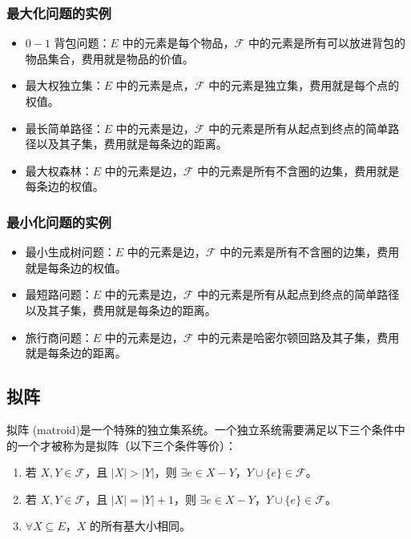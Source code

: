 \subsubsection{最大化问题的实例}
\begin{itemize}
    \item $0-1$ 背包问题：$E$ 中的元素是每个物品，$\mathcal{F}$ 中的元素是所有可以放进背包的物品集合，费用就是物品的价值。
    \item 最大权独立集：$E$ 中的元素是点，$\mathcal{F}$ 中的元素是独立集，费用就是每个点的权值。
    \item 最长简单路径：$E$ 中的元素是边，$\mathcal{F}$ 中的元素是所有从起点到终点的简单路径以及其子集，费用就是每条边的距离。
    \item 最大权森林：$E$ 中的元素是边，$\mathcal{F}$ 中的元素是所有不含圈的边集，费用就是每条边的权值。
\end{itemize}

\subsubsection{最小化问题的实例}
\begin{itemize}
    \item 最小生成树问题：$E$ 中的元素是边，$\mathcal{F}$ 中的元素是所有不含圈的边集，费用就是每条边的权值。
    \item 最短路问题：$E$ 中的元素是边，$\mathcal{F}$ 中的元素是所有从起点到终点的简单路径以及其子集，费用就是每条边的距离。
    \item 旅行商问题：$E$ 中的元素是边，$\mathcal{F}$ 中的元素是哈密尔顿回路及其子集，费用就是每条边的距离。
\end{itemize}

\subsection{拟阵}
拟阵 (matroid)是一个特殊的独立集系统。一个独立系统需要满足以下三个条件中的一个才被称为是拟阵（以下三个条件等价）：
\begin{enumerate}
    \item 若 $X, Y \in \mathcal{F}$，且 $|X| > |Y|$，则 $\exists e \in X - Y$，$Y \cup \{e\} \in \mathcal{F}$。
    \item 若 $X, Y \in \mathcal{F}$，且 $|X| = |Y| + 1$，则 $\exists e \in X - Y$，$Y \cup \{e\} \in \mathcal{F}$。
    \item $\forall X \subseteq E$，$X$ 的所有基大小相同。
\end{enumerate}

